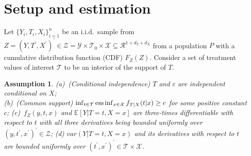 \documentclass[lettersize, 12pt]{article}
\newtheorem{assumption}{Assumption}
\begin{document}
\section{Setup and estimation}
\label{SecEst}
Let $\{Y_i, T_i, X_i\}_{i=1}^n$ be an i.i.d.~sample from 
$Z = (Y, T^\prime, X^\prime)^\prime \in \mathcal{Z} = \mathcal{Y}\times\mathcal{T}_0\times\mathcal{X} 
\subseteq \mathcal{R}^{1+d_T+d_X}$ from a population $P$ with
a cumulative distribution function (CDF) $F_{Z}(Z)$.
Consider a set of treatment values of interest $\mathcal{T}$ to be an interior of the support of $T$.

\begin{assumption}
(a)~{(Conditional independence)}
$T$ and $\varepsilon$ are independent conditional on $X$;%
\\
(b)~{(Common support)} 
$\inf_{t\in\mathcal{T}}{\rm ess}\inf_{x\in\mathcal{X}} f_{T|X}(t|x) \geq c$ for some positive constant $c$;
(c)~$f_{Z}(y,t,x)$ and $\mathbb{E}[Y|T=t, X=x]$ are three-times differentiable with respect to $t$ with all three derivatives being bounded uniformly over $(y,t^\prime,x^\prime)^\prime \in \mathcal{Z}$;
(d) $var(Y|T=t, X=x)$ and its derivatives with respect to $t$ are bounded uniformly over $(t^\prime,x^\prime)^\prime \in \mathcal{T}\times\mathcal{X}$.
\label{ACIACS}
\end{assumption}
\end{document}
